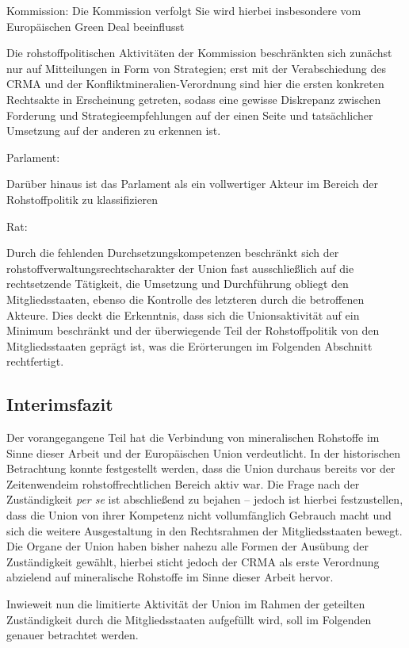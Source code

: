 \documentclass[12pt,a4paper,oneside]{book} %
\begin{document}
Kommission: Die Kommission verfolgt 
Sie wird hierbei insbesondere vom Europäischen Green Deal beeinflusst

Die rohstoffpolitischen Aktivitäten der Kommission beschränkten sich zunächst nur auf Mitteilungen in Form von Strategien; erst mit der Verabschiedung des CRMA und der Konfliktmineralien-Verordnung sind hier die ersten konkreten Rechtsakte in Erscheinung getreten, sodass eine gewisse Diskrepanz zwischen Forderung und Strategieempfehlungen auf der einen Seite und tatsächlicher Umsetzung auf der anderen zu erkennen ist.

Parlament: 

Darüber hinaus ist das Parlament als ein vollwertiger Akteur im Bereich der Rohstoffpolitik zu klassifizieren

Rat:



Durch die fehlenden Durchsetzungskompetenzen beschränkt sich der rohstoffverwaltungsrechtscharakter der Union fast ausschließlich auf die rechtsetzende Tätigkeit, die Umsetzung und Durchführung obliegt den Mitgliedsstaaten, ebenso die Kontrolle des letzteren durch die betroffenen Akteure. Dies deckt die Erkenntnis, dass sich die Unionsaktivität auf ein Minimum beschränkt und der überwiegende Teil der Rohstoffpolitik von den Mitgliedsstaaten geprägt ist, was die Erörterungen im Folgenden Abschnitt rechtfertigt.
	
	
	\subsection{Interimsfazit}
	Der vorangegangene Teil hat die Verbindung von mineralischen Rohstoffe im Sinne dieser Arbeit und der Europäischen Union verdeutlicht. In der historischen Betrachtung konnte festgestellt werden, dass die Union durchaus bereits vor der \glqq Zeitenwende\grqq im rohstoffrechtlichen Bereich aktiv war.
	Die Frage nach der Zuständigkeit \textit{per se} ist abschließend zu bejahen -- jedoch ist hierbei festzustellen, dass die Union von ihrer Kompetenz nicht vollumfänglich Gebrauch macht und sich die weitere Ausgestaltung in den Rechtsrahmen der Mitgliedsstaaten bewegt.
	Die Organe der Union haben bisher nahezu alle Formen der Ausübung der Zuständigkeit gewählt, hierbei sticht jedoch der CRMA als erste Verordnung abzielend auf mineralische Rohstoffe im Sinne dieser Arbeit hervor.
	
	Inwieweit nun die limitierte Aktivität der Union im Rahmen der geteilten Zuständigkeit durch die Mitgliedsstaaten aufgefüllt wird, soll im Folgenden genauer betrachtet
	 werden.
	 
\end{document}

